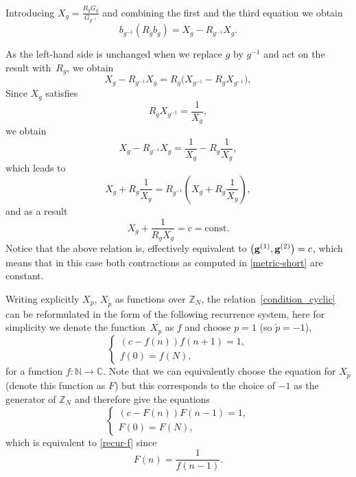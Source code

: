\documentclass[pdftex]{sigma}
\numberwithin{equation}{section}
\newcommand{\Z}{\mathbb{Z}}
\begin{document}
Introducing $X_g=\frac{R_gG_g}{G_{g^{-1}}}$ and combining the first and the third equation we obtain
\begin{equation}
b_{g^{-1}} ( R_g b_g ) =X_g - R_{g^{-1}} X_g. \label{war_X3_1}
\end{equation}

As the left-hand side is unchanged when we replace $g$ by $g^{-1}$ and act on the result with~$R_g$, we obtain
\begin{equation*}
X_g - R_{g^{-1}} X_g = R_g \big( X_{g^{-1}}- R_{g} X_{g^{-1}} \big),
\end{equation*}
Since $X_g$ satisfies
\[ R_g X_{g^{-1}} = \frac{1}{X_g}, \]
we obtain
\[
X_g - R_{g^{-1}} X_g =\frac{1}{X_g} - R_{g} \frac{1}{X_g},
\]
which leads to
\[
X_g + R_{g} \frac{1}{X_g} = R_{g^{-1}} \left( X_g + R_g \frac{1}{X_g} \right),
\]
and as a result
\begin{equation}
\label{condition_cyclic}
X_g+\frac{1}{R_gX_g}=c=\mathrm{const}.
\end{equation}
Notice that the above relation is, effectively equivalent to $\big({\bf g}^{(1)},{\bf g}^{(2)}\big)=c$, which means that in this case both contractions as
computed in \eqref{metric-short} are constant.

Writing explicitly $X_p$, $X_{\tilde{p}}$ as functions over $\Z_N$, the relation~\eqref{condition_cyclic} can be
reformulated in the form of the following recurrence system, here for simplicity we denote the function~$X_p$
as $f$ and choose $p=1$ (so $\tilde{p}=-1$),
\begin{equation}\label{recur-f}
\begin{cases}
(c-f(n))f(n + 1)=1,\\
f(0)=f(N),
\end{cases}
\end{equation}
for a function $f\colon \mathbb{N} \rightarrow \mathbb{C}$. Note that we can equivalently choose the equation for
$X_{\tilde{p}}$ (denote this function as $F$) but this corresponds to the choice of $-1$ as the generator of $\Z_N$
and therefore give the equations
\begin{equation*}%
\begin{cases}
(c-F(n))F(n - 1)=1,\\
F(0)=F(N),
\end{cases}
\end{equation*}
which is equivalent to \eqref{recur-f} since
\[ F(n) = \frac{1}{f(n-1)}.\]
\end{document}
